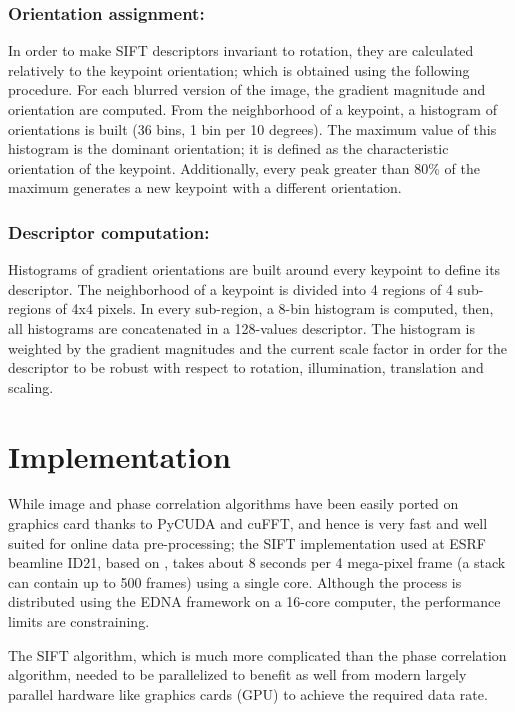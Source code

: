 \documentclass[preprint]{iucr}
\begin{document}
\subsubsection{Orientation assignment:}
In order to make SIFT descriptors invariant to rotation, they are calculated
relatively to the keypoint orientation; which is obtained using the following
procedure.
For each blurred version of the image, the gradient magnitude and orientation
are computed.
From the neighborhood of a keypoint, a histogram of orientations is built (36
bins, 1 bin per 10 degrees).
The maximum value of this histogram is the dominant orientation; it is defined
as the characteristic orientation of the keypoint.
Additionally, every peak greater than 80\% of the maximum generates a new
keypoint with a different orientation.



\subsubsection{Descriptor computation:}
Histograms of gradient orientations are built around every keypoint to define
its descriptor.
The neighborhood of a keypoint is divided into 4 regions of 4 sub-regions of 4x4
pixels.
In every sub-region, a 8-bin histogram is computed, then, all histograms
are concatenated in a 128-values descriptor.
The histogram is weighted by the gradient magnitudes and the current scale
factor in order for the descriptor to be robust with respect to rotation,
illumination, translation and scaling.


\section{Implementation}

While image and phase correlation algorithms have been easily ported on
graphics card thanks to PyCUDA \cite{pyopencl} and cuFFT, and hence is very fast and well
suited for online data pre-processing;
the SIFT implementation used at ESRF beamline ID21, based on \cite{ASIFT},
takes about 8 seconds per 4 mega-pixel frame  (a stack can contain up to  500
frames) using a single core.
Although the process is distributed using the EDNA framework \cite{edna} on a
16-core computer, the performance limits are constraining.

The SIFT algorithm, which is much more complicated than the phase
correlation algorithm, needed to be parallelized to benefit as well from modern
largely parallel hardware like graphics cards (GPU) to achieve the required
data rate.
\end{document}
